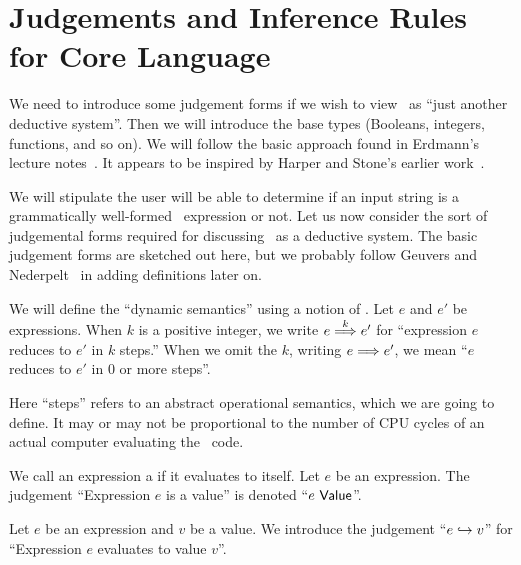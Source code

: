 \section{Judgements and Inference Rules for Core Language}

\begin{node}\label{sml-0003}%
We need to introduce some judgement forms if we wish to view \SML\ as
``just another deductive system''. Then we will introduce the base types
(Booleans, integers, functions, and so on). We will follow the basic
approach found in Erdmann's lecture notes~\cite{erdmann2023evaluation}.
It appears to be inspired by Harper and Stone's earlier work~\cite{harper2000:smltt-final}.
\end{node}

\begin{node}\label{sml-0004}%
We will stipulate the user will be able to determine if an input string
is a grammatically well-formed \SML\ expression or not. Let us now
consider the sort of judgemental forms required for discussing \SML\ as
a deductive system. The basic judgement forms are sketched out here, but
we probably follow Geuvers and Nederpelt~\cite{nederpelt2014type} in
adding definitions later on.

\begin{node}\label{sml-0005}%
We will define the ``dynamic semantics'' using a notion of
. Let $e$ and $e'$ be expressions. When $k$ is a
positive integer, we write $e\Reduces{k}e'$ for ``expression $e$ reduces
to $e'$ in $k$ steps.'' When we omit the $k$, writing $e\Reduces{}e'$,
we mean ``$e$ reduces to $e'$ in $0$ or more steps''.

Here ``steps'' refers to an abstract operational semantics, which we are
going to define. It may or may not be proportional to the number of CPU
cycles of an actual computer evaluating the \SML\ code.
\end{node}

\begin{node}\label{sml-0006}%
We call an expression a  if it evaluates to itself.
Let $e$ be an expression. The judgement ``Expression $e$ is a value'' is
denoted ``$e~\mathsf{Value}$''.
\end{node}

\begin{node}\label{sml-0007}%
Let $e$ be an expression and $v$ be a value. We introduce the judgement
``$e\hookrightarrow v$'' for ``Expression $e$ evaluates to value $v$''. 


\end{node}
\end{node}

